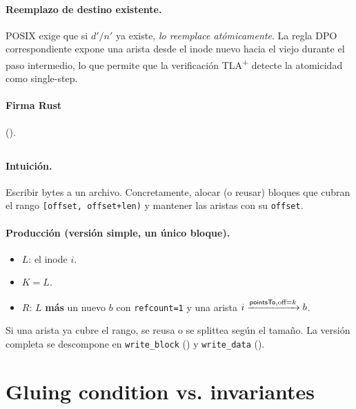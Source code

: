 \paragraph{Reemplazo de destino existente.} POSIX exige que si $d'/n'$ ya
existe, \oprename{} \emph{lo reemplace atómicamente}. La regla DPO
correspondiente expone una arista \esupersedes{} desde el inode nuevo
hacia el viejo durante el paso intermedio, lo que permite que la
verificación TLA\textsuperscript{+} 
detecte la atomicidad como single-step.

\paragraph{Firma Rust} ().

\subsection{\opwrite}

\paragraph{Intuición.} Escribir bytes a un archivo. Concretamente, alocar
(o reusar) bloques que cubran el rango \texttt{[offset, offset+len)}
y mantener las aristas \epointsto{} con su \texttt{offset}.

\paragraph{Producción (versión simple, un único bloque).}

\begin{itemize}
  \item $L$: el inode $i$.
  \item $K = L$.
  \item $R$: $L$ \textbf{más} un nuevo \NBlk{} $b$ con
    \texttt{refcount=1} y una arista $i \xrightarrow{\textsf{pointsTo}, \text{off}=k} b$.
\end{itemize}

Si una arista \epointsto{} ya cubre el rango, se reusa o se splittea
según el tamaño. La versión completa se descompone en
\texttt{write\_block} () y
\texttt{write\_data} ().

\section{Gluing condition vs. invariantes}

